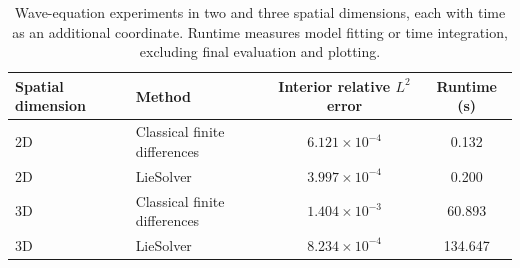 \begin{table}[htbp]
    \centering
    \begin{tabular}{llcc}
        \hline
        Spatial dimension & Method & Interior relative $L^2$ error & Runtime (s) \\
        \hline
        2D & Classical finite differences & $6.121 \times 10^{-4}$ & 0.132 \\
        2D & LieSolver & $3.997 \times 10^{-4}$ & 0.200 \\
        3D & Classical finite differences & $1.404 \times 10^{-3}$ & 60.893 \\
        3D & LieSolver & $8.234 \times 10^{-4}$ & 134.647 \\
        \hline
    \end{tabular}
    \caption{Wave-equation experiments in two and three spatial dimensions,
    each with time as an additional coordinate. Runtime measures model fitting
    or time integration, excluding final evaluation and plotting.}
    \label{tab:wave_2d_3d_comparison}
\end{table}
